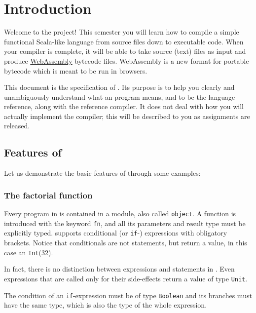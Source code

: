 \section{Introduction}

Welcome to the \langname project! This semester you will learn how to compile a simple functional
Scala-like language
from source files down to executable code. When your compiler is complete,
it will be able to take \langname source (text) files as input and produce
\href{http://webassembly.org}{WebAssembly} bytecode files.
WebAssembly is a new format for portable bytecode which is meant to be run in browsers.

This document is the specification of \langname. Its purpose is to help you clearly
and unambiguously understand what an \langname program means,
and to be the \langname language reference,
along with the reference compiler.
It does not deal with how you will actually implement the compiler;
this will be described to you as assignments are released.

\subsection{Features of \langname}
Let us demonstrate the basic features of \langname through some examples:

\subsubsection{The factorial function}

\begin{figure}[h]
    
\end{figure}

Every program in \langname is contained in a module, also called \lstinline{object}.
A function is introduced with the keyword \lstinline{fn}, and all its parameters
and result type must be explicitly typed.
\langname supports conditional (or \lstinline{if}-) expressions with obligatory brackets.
Notice that conditionals are not statements, but return a value,
in this case an \lstinline{Int}(32).

In fact, there is no distinction between expressions
and statements in \langname. Even expressions that are called only for their
side-effects return a value of type \lstinline{Unit}.

The condition of an \lstinline{if}-expression must be of type \lstinline{Boolean}
and its branches must have the same type, which is also the type of the whole expression.

